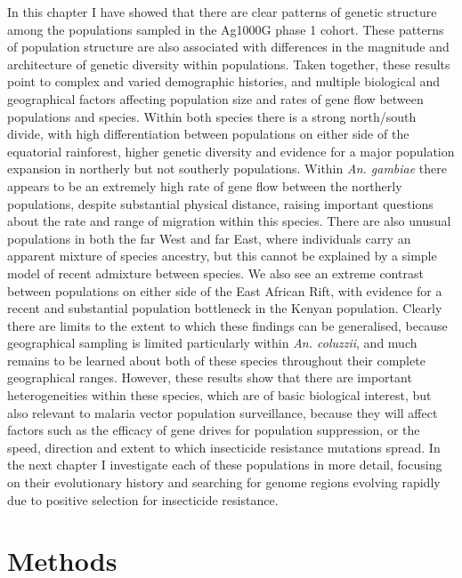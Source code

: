 \begin{refsection}
In this chapter I have showed that there are clear patterns of genetic structure among the populations sampled in the Ag1000G phase 1 cohort.
%
These patterns of population structure are also associated with differences in the magnitude and architecture of genetic diversity within populations.
%
Taken together, these results point to complex and varied demographic histories, and multiple biological and geographical factors affecting population size and rates of gene flow between populations and species.
%
Within both species there is a strong north/south divide, with high differentiation between populations on either side of the equatorial rainforest, higher genetic diversity and evidence for a major population expansion in northerly but not southerly populations.
%
Within \textit{An. gambiae} there appears to be an extremely high rate of gene flow between the northerly populations, despite substantial physical distance, raising important questions about the rate and range of migration within this species.
%
There are also unusual populations in both the far West and far East, where individuals carry an apparent mixture of species ancestry, but this cannot be explained by a simple model of recent admixture between species.
%
We also see an extreme contrast between populations on either side of the East African Rift, with evidence for a recent and substantial population bottleneck in the Kenyan population.
%
Clearly there are limits to the extent to which these findings can be generalised, because geographical sampling is limited particularly within \textit{An. coluzzii}, and much remains to be learned about both of these species throughout their complete geographical ranges.
%
However, these results show that there are important heterogeneities within these species, which are of basic biological interest, but also relevant to malaria vector population surveillance, because they will affect factors such as the efficacy of gene drives for population suppression, or the speed, direction and extent to which insecticide resistance mutations spread.
%
In the next chapter I investigate each of these populations in more detail, focusing on their evolutionary history and searching for genome regions evolving rapidly due to positive selection for insecticide resistance.


\section{Methods}\label{sec:ch4-methods}



\end{refsection}
